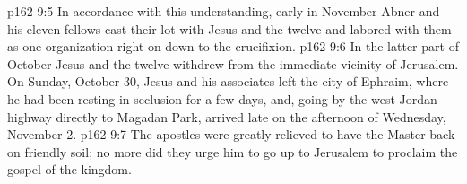 \vs p162 9:5 In accordance with this understanding, early in November Abner and his eleven fellows cast their lot with Jesus and the twelve and labored with them as one organization right on down to the crucifixion.
\vs p162 9:6 In the latter part of October Jesus and the twelve withdrew from the immediate vicinity of Jerusalem. On Sunday, October 30, Jesus and his associates left the city of Ephraim, where he had been resting in seclusion for a few days, and, going by the west Jordan highway directly to Magadan Park, arrived late on the afternoon of Wednesday, November 2.
\vs p162 9:7 The apostles were greatly relieved to have the Master back on friendly soil; no more did they urge him to go up to Jerusalem to proclaim the gospel of the kingdom.
